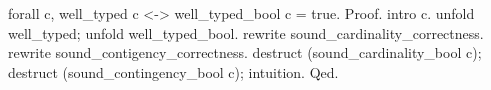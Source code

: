   forall c, well_typed c <-> well_typed_bool c = true.
Proof.
  intro c. unfold well_typed; unfold well_typed_bool.
  rewrite sound_cardinality_correctness.
  rewrite sound_contigency_correctness.
  destruct (sound_cardinality_bool c);
  destruct (sound_contingency_bool c); intuition.
Qed. 